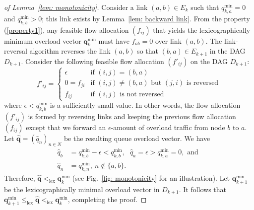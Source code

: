 \documentclass{sig-alternate-2013}
\newcommand{\lex}{\operatorname{lex}}
\begin{document}
\begin{proof}[of Lemma~\ref{lem: monotonicity}]
Consider a link $(a, b) \in E_{k}$ such that $q_{k,a}^{\text{min}}=0$ and  $q_{k,b}^{\text{min}}>0$; this link exists by Lemma~\ref{lem: backward link}. From the property (\ref{property1}), any feasible flow allocation $(f_{ij})$ that yields the lexicographically minimum overload vector $\bm{q}_{k}^{\text{min}}$ must have $f_{ab}=0$ over link $(a, b)$. The link-reversal algorithm reverses the link $(a, b)$ so that $(b, a) \in E_{k+1}$ in the DAG $D_{k+1}$. Consider the following feasible flow allocation $(f'_{ij})$ on the DAG $D_{k+1}$:
\[
f'_{ij} = \begin{cases}
	\epsilon& \text{if $(i, j)=(b, a)$} \\
	0 = f_{ji} & \text{if  $(i, j) \neq (b, a)$ but $(j, i)$ is reversed}\\
	f_{ij} & \text{if $(i, j)$ is not reversed}
	\end{cases}
\]
where $\epsilon < q_{k,b}^{\text{min}}$ is a sufficiently small value. In other words, the flow allocation $(f'_{ij})$ is formed by reversing links and keeping the previous flow allocation $(f_{ij})$ except that we forward an $\epsilon$-amount of overload traffic from node $b$ to $a$. Let $\widehat{\bm{q}}=(\widehat{q}_{n})_{n\in N}$ be the resulting queue overload vector. We have
\begin{align*}
\widehat{q}_{b} &= q_{k, b}^{\text{min}} - \epsilon < q_{k, b}^{\text{min}}, \text { } \widehat{q}_{a} = \epsilon > q_{k, a}^{\text{min}}=0, \text{ and }\\
\widehat{q}_{n} &= q_{k, n}^{\text{min}}, \ n\notin \{a, b\}.
\end{align*}
Therefore, $\widehat{\bm{q}} <_{\lex} \bm{q}_{k}^{\text{min}}$ (see Fig.~\ref{fig: monotonicity} for an illustration). Let $\bm{q}_{k+1}^{\text{min}}$ be the lexicographically minimal overload vector in $D_{k+1}$. It follows that $\bm{q}_{k+1}^{\text{min}} \leq_{\lex} \widehat{\bm{q}} <_{\lex} \bm{q}_{k}^{\text{min}}$, completing the proof.
\end{proof}
\end{document}
